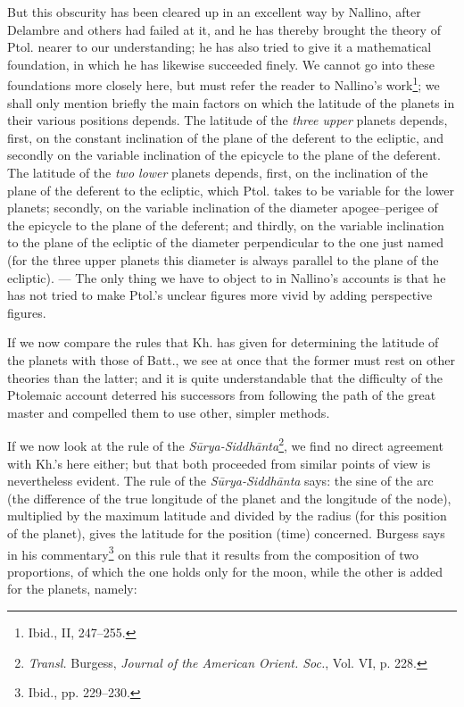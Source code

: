 \documentclass[11pt]{article}
\newcommand{\Pg}[1]{\marginpar{\footnotesize\color{gray}#1}}
\begin{document}
\par But this obscurity has been cleared up in an excellent way by Nallino, after Delambre and others had failed at it, and he has thereby brought the theory of Ptol. nearer to our understanding; he has also tried to give it a mathematical foundation, in which he has likewise succeeded finely. We cannot go into these foundations more closely here, but must refer the reader to Nallino's work\footnote{Ibid., II, 247–255.}; we shall only mention briefly the main factors on which the latitude of the planets in their various positions depends. The latitude of the \emph{three upper} planets depends, first, on the constant inclination of the plane of the deferent to the ecliptic, and secondly on the variable inclination of the epicycle to the plane of the deferent. The latitude of the \emph{two lower} planets depends, first, on the inclination of the plane of the deferent to the ecliptic, which Ptol. takes to be variable for the lower planets; secondly, on the variable inclination of the diameter apogee–perigee of the epicycle to the plane of the deferent; and thirdly, on the variable inclination to the plane of the ecliptic of the diameter perpendicular to the one just named (for the three upper planets this diameter is always parallel to the plane of the ecliptic). — The only thing we have to object to in Nallino's accounts is that he has not tried to make Ptol.'s unclear figures more vivid by adding perspective figures.\par
\par If we now compare the rules that Kh. has given for determining the latitude of the planets with those of Batt., we see at once that the former must rest on other theories than the latter; and it is quite understandable that the difficulty of the Ptolemaic account deterred his successors from following the path of the great master and compelled them to use other, simpler methods.\par
\par \Pg{61}If we now look at the rule of the \emph{Sūrya-Siddhānta}\footnote{\emph{Transl.} Burgess, \emph{Journal of the American Orient. Soc.}, Vol. VI, p. 228.}, we find no direct agreement with Kh.'s here either; but that both proceeded from similar points of view is nevertheless evident. The rule of the \emph{Sūrya-Siddhānta} says: the sine of the arc (the difference of the true longitude of the planet and the longitude of the node), multiplied by the maximum latitude and divided by the radius (for this position of the planet), gives the latitude for the position (time) concerned. Burgess says in his commentary\footnote{Ibid., pp. 229–230.} on this rule that it results from the composition of two proportions, of which the one holds only for the moon, while the other is added for the planets, namely:\par
\end{document}
